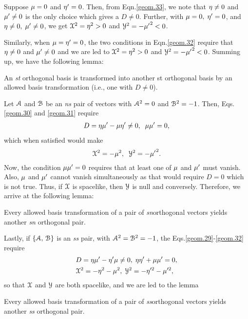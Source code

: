 Suppose ${\mu}=0$ and  ${\eta}'=0$. Then, from 
Eqn.\eqref{geom.33}, we note that ${\eta}\neq 0$ and 
${\mu}'\neq 0$ is the only choice which gives a $D\neq 
0$. Further, with ${\mu}=0, \; {\eta}'=0$, and ${\eta}\neq 
0,\;{\mu}'\neq 0$, we get  $\EuScript{X}^2 ={{\eta}}^2>0$ 
and $\EuScript{Y}^2 =-{{\mu}'}^2 < 0$.

Similarly, when ${\mu}={\eta}'=0$, the two conditions in 
Eqn.\eqref{geom.32} require that ${\eta}\neq 0$ and 
${\mu}'\neq 0$ and we are led to   $\EuScript{X}^2 
={{\eta}}^2 > 0$ and $\EuScript{Y}^2 =-{{\mu}'}^2 < 0$. 
Summing up, we have the following lemma:

\Lem An \textsl{st} orthogonal basis is transformed  
into another st orthogonal basis by an allowed basis  
transformation (i.e., one with $D\neq 0$).

Let $\EuScript{A}$ 
and 
$\EuScript{B}$ be an \textsl{ns} pair of vectors with 
$\EuScript{A}^2=0$ and $\EuScript{B}^2=-1$. Then, 
Eqs.\eqref{geom.30} and \eqref{geom.31} require
\begin{align*}
D={\eta}{\mu}'-{\mu}{\eta}'\neq 0, \;\;
{\mu}{\mu}'=0,
\end{align*}
which when satisfied would make
\begin{align*}
\EuScript{X}^2=-{\mu}^2,\;\;
\EuScript{Y}^2=  -{{\mu}'}^2.
\end{align*}
Now, the condition ${\mu}{\mu}'=0$ requires that at 
least 
one of ${\mu}$ and ${\mu}'$ must vanish. Also, ${\mu}$ 
and 
${\mu}'$ cannot vanish  simultaneously as that would 
require $D=0$ which is not true.  Thus, if 
$\EuScript{X}$ is spacelike, then $ \EuScript{Y}$  is 
null and conversely. Therefore, we arrive at the 
following lemma:

\Lem Every allowed basis transformation of a pair of 
 \textsl{sn}\lbk orthogonal vectors yields another  
\textsl{sn} orthogonal  pair.

 Lastly, if 
$\{\EuScript{A},\,\EuScript{B}\}$ is an \textsl{ss} 
pair,  with $\EuScript{A}^2 =\EuScript{B}^2=-1$, the 
Eqs.\eqref{geom.29}-\eqref{geom.32} require
\begin{align*}
&D={\eta}{\mu}'-{\eta}'{\mu}\neq 0,\; 
{\eta}{\eta}'+{\mu}{\mu}'=0,\\
&\EuScript{X}^2=-{\eta}^2-{\mu}^2,\;\EuScript{Y}^2
=-{\eta}'^2-{\mu}'^2,
\end{align*}
so that $\EuScript{X}$ and $\EuScript{Y}$ are both 
spacelike, and we are led to the lemma

\Lem  Every allowed basis transformation of a pair of
 \textsl{ss}\lbk orthogonal vectors yields another  
\textsl{ss} orthogonal  pair.

